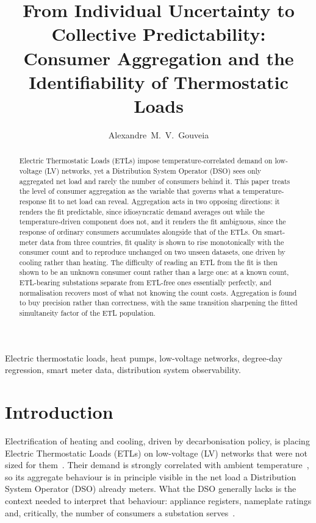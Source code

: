 \documentclass[9pt,journal,a4]{IEEEtran}
\begin{document}
\title{From Individual Uncertainty to Collective Predictability: Consumer Aggregation and the Identifiability of Thermostatic Loads}

\author{Alexandre~M.~V.~Gouveia}

\maketitle

\begin{abstract}
Electric Thermostatic Loads (ETLs) impose temperature-correlated demand on low-voltage (LV) networks, yet a Distribution System Operator (DSO) sees only aggregated net load and rarely the number of consumers behind it. This paper treats the level of consumer aggregation as the variable that governs what a temperature-response fit to net load can reveal. Aggregation acts in two opposing directions: it renders the fit predictable, since idiosyncratic demand averages out while the temperature-driven component does not, and it renders the fit ambiguous, since the response of ordinary consumers accumulates alongside that of the ETLs. On smart-meter data from three countries, fit quality is shown to rise monotonically with the consumer count and to reproduce unchanged on two unseen datasets, one driven by cooling rather than heating. The difficulty of reading an ETL from the fit is then shown to be an unknown consumer count rather than a large one: at a known count, ETL-bearing substations separate from ETL-free ones essentially perfectly, and normalisation recovers most of what not knowing the count costs. Aggregation is found to buy precision rather than correctness, with the same transition sharpening the fitted simultaneity factor of the ETL population.
\end{abstract}

\begin{IEEEkeywords}
Electric thermostatic loads, heat pumps, low-voltage networks, degree-day regression, smart meter data, distribution system observability.
\end{IEEEkeywords}


\section{Introduction}
\label{section:intro}

Electrification of heating and cooling, driven by decarbonisation policy, is placing Electric Thermostatic Loads (ETLs) on low-voltage (LV) networks that were not sized for them~\cite{Lov17, Bec24}. Their demand is strongly correlated with ambient temperature~\cite{Che21b}, so its aggregate behaviour is in principle visible in the net load a Distribution System Operator (DSO) already meters. What the DSO generally lacks is the context needed to interpret that behaviour: appliance registers, nameplate ratings and, critically, the number of consumers a substation serves~\cite{Gou26}.
\end{document}
